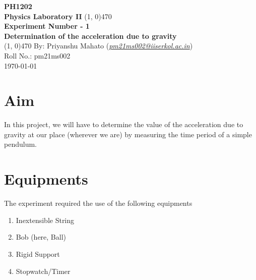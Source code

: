 \documentclass[12pt]{article}
\begin{document}
	\thispagestyle{empty}
	\begin{titlepage}
		\begin{center}
			\vspace{2cm}
			\huge\textbf{PH1202}\\
			\vspace{1cm}
			\large\textbf{Physics Laboratory II}
			\vfill
			\line(1, 0){470}\\[14pt]
			\huge\textbf{\color{ChadBlue}\sffamily Experiment Number - 1}\\[10pt]
			\Large\textbf{\color{mauve}\sffamily Determination of the acceleration due to gravity}\\[14pt]
			\line(1, 0){470}
			\vfill
			By: Priyanshu Mahato (\href{mailto:pm21ms002@iiserkol.ac.in}{\emph{\color{dkgreen}pm21ms002@iiserkol.ac.in}})\\
			Roll No.: pm21ms002\\
			\today
		\end{center}
	\end{titlepage}

	\section{Aim}
	In this project, we will have to determine the value of the acceleration due to gravity at our place (wherever we are) by measuring the time period of a simple pendulum. 
	
	\section{Equipments}
	The experiment required the use of the following equipments
	\begin{enumerate}
		\item Inextensible String
		\item Bob (here, Ball)
		\item Rigid Support
		\item Stopwatch/Timer
	\end{enumerate}
\end{document}
